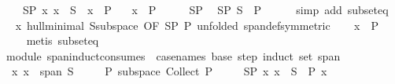 \begin{isabellebody}
\ \ \ \ \ SP{\isacharcolon}{\kern0pt}\ {\isachardoublequoteopen}{\isasymAnd}x{\isachardot}{\kern0pt}\ x\ {\isasymin}\ S\ {\isasymLongrightarrow}\ x\ {\isasymin}\ P{\isachardoublequoteclose}\isanewline
\ \ \ {\isachardoublequoteopen}x\ {\isasymin}\ P{\isachardoublequoteclose}\isanewline
%
\isadelimproof
%
\endisadelimproof
%
\isatagproof
{}\isamarkupfalse%
\ {\isacharminus}{\kern0pt}\isanewline
\ \ \isamarkupfalse%
\ SP\ \isamarkupfalse%
\ SP{\isacharprime}{\kern0pt}{\isacharcolon}{\kern0pt}\ {\isachardoublequoteopen}S\ {\isasymsubseteq}\ P{\isachardoublequoteclose}\isanewline
\ \ \ \ \isamarkupfalse%
\ {\isacharparenleft}{\kern0pt}simp\ add{\isacharcolon}{\kern0pt}\ subset{\isacharunderscore}{\kern0pt}eq{\isacharparenright}{\kern0pt}\isanewline
\ \ \isamarkupfalse%
\ x\ hull{\isacharunderscore}{\kern0pt}minimal{\isacharbrackleft}{\kern0pt}\ S{\isacharequal}{\kern0pt}subspace{\isacharcomma}{\kern0pt}\ OF\ SP{\isacharprime}{\kern0pt}\ P{\isacharcomma}{\kern0pt}\ unfolded\ span{\isacharunderscore}{\kern0pt}def{\isacharbrackleft}{\kern0pt}symmetric{\isacharbrackright}{\kern0pt}{\isacharbrackright}{\kern0pt}\isanewline
\ \ \isamarkupfalse%
\ {\isachardoublequoteopen}x\ {\isasymin}\ P{\isachardoublequoteclose}\isanewline
\ \ \ \ \isamarkupfalse%
\ {\isacharparenleft}{\kern0pt}metis\ subset{\isacharunderscore}{\kern0pt}eq{\isacharparenright}{\kern0pt}\isanewline
{}\isamarkupfalse%
%
\endisatagproof
{\isafoldproof}%
%
\isadelimproof
\isanewline
%
\endisadelimproof
\isanewline
{}\isamarkupfalse%
\ {\isacharparenleft}{\kern0pt}\ module{\isacharparenright}{\kern0pt}\ span{\isacharunderscore}{\kern0pt}induct{\isacharbrackleft}{\kern0pt}consumes\ {}{\isacharcomma}{\kern0pt}\ case{\isacharunderscore}{\kern0pt}names\ base\ step{\isacharcomma}{\kern0pt}\ induct\ set{\isacharcolon}{\kern0pt}\ span{\isacharbrackright}{\kern0pt}{\isacharcolon}{\kern0pt}\isanewline
\ \ \ x{\isacharcolon}{\kern0pt}\ {\isachardoublequoteopen}x\ {\isasymin}\ span\ S{\isachardoublequoteclose}\isanewline
\ \ \ \ \ P{\isacharcolon}{\kern0pt}\ {\isachardoublequoteopen}subspace\ {\isacharparenleft}{\kern0pt}Collect\ P{\isacharparenright}{\kern0pt}{\isachardoublequoteclose}\isanewline
\ \ \ \ \ SP{\isacharcolon}{\kern0pt}\ {\isachardoublequoteopen}{\isasymAnd}x{\isachardot}{\kern0pt}\ x\ {\isasymin}\ S\ {\isasymLongrightarrow}\ P\ x{\isachardoublequoteclose}\isanewline

\end{isabellebody}
